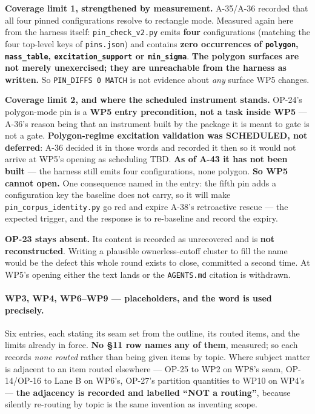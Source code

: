 \documentclass[
  10pt,
]{article}
\begin{document}
\textbf{Coverage limit 1, strengthened by measurement.} A-35/A-36 recorded that all four pinned configurations resolve to rectangle mode. Measured again here from the harness itself: \texttt{pin\_check\_v2.py} emits \textbf{four} configurations (matching the four top-level keys of \texttt{pins.json}) and contains \textbf{zero occurrences of \texttt{polygon}, \texttt{mass\_table}, \texttt{excitation\_support} or \texttt{min\_sigma}}. \textbf{The polygon surfaces are not merely unexercised; they are unreachable from the harness as written.} So \texttt{PIN\_DIFFS 0 MATCH} is not evidence about \emph{any} surface WP5 changes.

\textbf{Coverage limit 2, and where the scheduled instrument stands.} OP-24's polygon-mode pin is a \textbf{WP5 entry precondition, not a task inside WP5} --- A-36's reason being that an instrument built by the package it is meant to gate is not a gate. \textbf{Polygon-regime excitation validation was SCHEDULED, not deferred}: A-36 decided it in those words and recorded it then so it would not arrive at WP5's opening as scheduling TBD. \textbf{As of A-43 it has not been built} --- the harness still emits four configurations, none polygon. \textbf{So WP5 cannot open.} One consequence named in the entry: the fifth pin adds a configuration key the baseline does not carry, so it will make \texttt{pin\_corpus\_identity.py} go red and expire A-38's retroactive rescue --- the expected trigger, and the response is to re-baseline and record the expiry.

\textbf{OP-23 stays absent.} Its content is recorded as unrecovered and is \textbf{not reconstructed}. Writing a plausible ownerless-cutoff cluster to fill the name would be the defect this whole round exists to close, committed a second time. At WP5's opening either the text lands or the \texttt{AGENTS.md} citation is withdrawn.

\paragraph{WP3, WP4, WP6--WP9 --- placeholders, and the word is used precisely.}
Six entries, each stating its seam set from the outline, its routed items, and the limits already in force. \textbf{No \S11 row names any of them}, measured; so each records \emph{none routed} rather than being given items by topic. Where subject matter is adjacent to an item routed elsewhere --- OP-25 to WP2 on WP8's seam, OP-14/OP-16 to Lane B on WP6's, OP-27's partition quantities to WP10 on WP4's --- \textbf{the adjacency is recorded and labelled ``NOT a routing''}, because silently re-routing by topic is the same invention as inventing scope.
\end{document}
